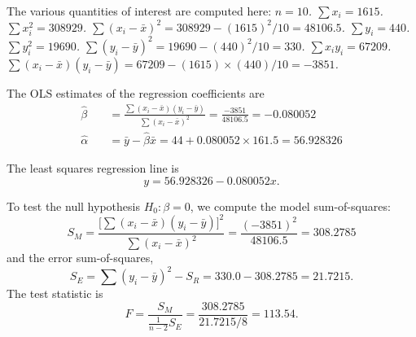 \begin{solution}
The various quantities of interest are computed here:
\bit
\it $n = 10$.
\it $\sum x_{i} = 1615$.
\it $\sum x_{i}^{2}	= 308929$.
\it $\sum (x_i-\bar{x})^2	= 308929 - (1615)^{2}/10 = 48106.5$.
\it $\sum y_{i} =  440$.
\it $\sum y_{i}^{2}  = 19690$.
\it $\sum (y_i-\bar{y})^2 = 19690 - (440)^{2}/10 = 330$.
\it $\sum x_{i}y_{i}	= 67209$.
\it $\sum (x_i-\bar{x})(y_i-\bar{y})	= 67209 - (1615){\times}(440)/10 = -3851$.
\eit

The OLS estimates of the regression coefficients are
\begin{align*}
\hat{\beta}		&\quad = \frac{\sum (x_i-\bar{x})(y_i-\bar{y})}{\sum (x_i-\bar{x})^2} = \frac{-3851}{48106.5} = -0.080052 \\
\hat{\alpha}	&\quad = \bar{y}-\hat{\beta}\bar{x} = 44 + 0.080052{\times}161.5 = 56.928326
\end{align*}

The least squares regression line is 
\[
y = 56.928326 - 0.080052x.
\]

To test the null hypothesis $H_0:\beta=0$, we compute the model sum-of-squares:
\[
S_M 
	= \frac{\big[\sum (x_i-\bar{x})(y_i-\bar{y})\big]^{2}}{\sum (x_i-\bar{x})^2} 
	=\frac{(-3851)^{2}}{48106.5} 
	= 308.2785
\]
and the error sum-of-squares,
\[
S_E
	= \sum (y_i-\bar{y})^2 - S_R = 330.0 - 308.2785 =  21.7215.
\]
The test statistic is
\[
F = \frac{S_M}{\frac{1}{n-2}S_E} = \frac{308.2785}{21.7215/8} = 113.54.
\]


\end{solution}
